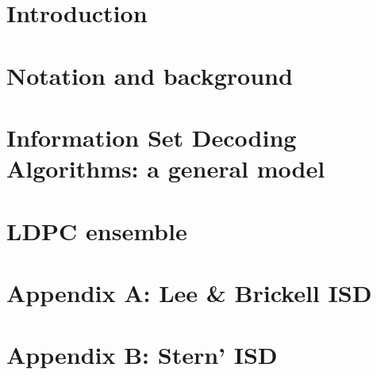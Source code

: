 \documentclass[letter]{IEEEtran}
\begin{document}

    
\IEEEpeerreviewmaketitle
    
\section{Introduction}


\section{Notation and background}

        
\section{Information Set Decoding Algorithms: a general model}


\section{LDPC ensemble}








\section*{Appendix A: Lee \& Brickell ISD}


\section*{Appendix B: Stern' ISD}

\end{document}

